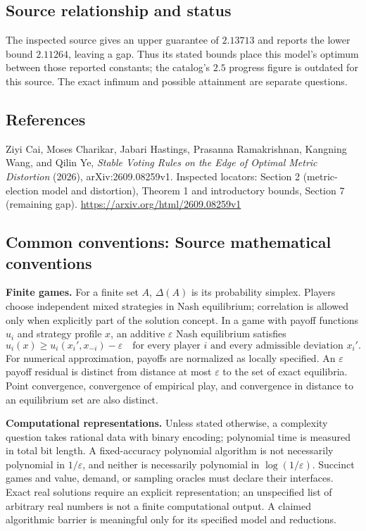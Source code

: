 \documentclass[11pt,a4paper]{article}
\begin{document}
\subsection*{Source relationship and status}
The inspected source gives an upper guarantee of $2.13713$ and reports the lower bound $2.11264$, leaving a gap. Thus its stated bounds place this model's optimum between those reported constants; the catalog's $2.5$ progress figure is outdated for this source. The exact infimum and possible attainment are separate questions.

\subsection*{References}
\begingroup\footnotesize\raggedright
\noindent [S1] Ziyi Cai, Moses Charikar, Jabari Hastings, Prasanna Ramakrishnan, Kangning Wang, and Qilin Ye, \emph{Stable Voting Rules on the Edge of Optimal Metric Distortion} (2026), arXiv:2609.08259v1. Inspected locators: Section 2 (metric-election model and distortion), Theorem 1 and introductory bounds, Section 7 (remaining gap).
\url{https://arxiv.org/html/2609.08259v1}
\par\endgroup

\subsection*{Common conventions: Source mathematical conventions}

\textbf{Finite games.} For a finite set $A$, $\Delta(A)$ is its probability
simplex. Players choose independent mixed strategies in Nash equilibrium;
correlation is allowed only when explicitly part of the solution concept.
In a game with payoff functions $u_i$ and strategy profile $x$, an additive
$\varepsilon$ Nash equilibrium satisfies
\[
 u_i(x)\geq u_i(x_i',x_{-i})-\varepsilon
 \quad\text{for every player $i$ and every admissible deviation $x_i'$}.
\]
For numerical approximation, payoffs are normalized as locally specified.
An $\varepsilon$ payoff residual is distinct from distance at most
$\varepsilon$ to the set of exact equilibria. Point convergence, convergence
of empirical play, and convergence in distance to an equilibrium set are
also distinct.

\textbf{Computational representations.} Unless stated otherwise, a complexity
question takes rational data with binary encoding; polynomial time is measured
in total bit length. A fixed-accuracy polynomial algorithm is not necessarily
polynomial in $1/\varepsilon$, and neither is necessarily polynomial in
$\log(1/\varepsilon)$. Succinct games and value, demand, or sampling oracles
must declare their interfaces. Exact real solutions require an explicit
representation; an unspecified list of arbitrary real numbers is not a
finite computational output. A claimed algorithmic barrier is meaningful
only for its specified model and reductions.
\end{document}
